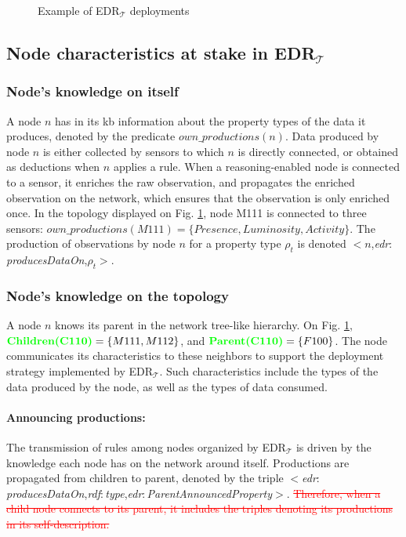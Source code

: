\documentclass{iosart2c}
\newcommand{\edrt}{EDR$_{\mathcal{T}}$\xspace}
\newcommand{\added}[1]{\textcolor{green}{\textbf{#1}}}
\newcommand{\removed}[1]{\textcolor{red}{\sout{#1}}}
\newcommand{\namespace}[1]{\textit{#1$:$}}
\newcommand{\concept}[2]{\namespace{#1}\-\textit{#2}}
\newcommand{\triplet}[3]{$<$#1,\textit{#2},#3$>$}
\begin{document}
\begin{figure}
	\centering
	\caption{Example of \edrt deployments}
	\label{fig:edrpt_deployment}
	\scalebox{0.8}{
		
	}
\end{figure}

\subsection{Node characteristics at stake in \edrt}
\label{subs:edrt_knowledge}

\subsubsection{Node's knowledge on itself}
\label{subsub:self-knowledge}

A node $n$ has in its \gls{kb} information about the property types of the data it produces, denoted by the predicate $own\_productions(n)$.
Data produced by node $n$ is either collected by sensors to which $n$ is directly connected, or obtained as deductions when $n$ applies a rule.
When a reasoning-enabled node is connected to a sensor, it enriches the raw observation, and propagates the enriched observation on the network, which ensures that the observation is only enriched once. 
In the topology displayed on Fig. \ref{fig:edrpt_deployment}, node M111 is connected to three sensors: $own\_productions(M111) = \{Presence, Luminosity, Activity\}$.
The production of observations by node $n$ for a property type $\rho_t$ is denoted \triplet{$n$}{\concept{edr}{produces\-Data\-On}}{$\rho_t$}. 

\subsubsection{Node's knowledge on the topology}
\label{subsub:topology}

A node $n$ knows its parent in the network tree-like hierarchy. 
On Fig. \ref{fig:edrpt_deployment}, $\added{Children(C110)}=\{M111, M112\}$, and $\added{Parent(C110)}=\{F100\}$.
The node communicates its characteristics to these neighbors to support the deployment strategy implemented by \edrt.
Such characteristics include the types of the data produced by the node, as well as the types of data consumed.

\paragraph{Announcing productions:}
The transmission of rules among nodes organized by \edrt is driven by the knowledge each node has on the network around itself.
Productions are propagated from children to parent, denoted by the triple \triplet{\concept{edr}{produces\-Data\-On}}{\concept{rdf}{type}}{\concept{edr}{Parent\-Announced\-Property}}. 
\removed{Therefore, when a child node connects to its parent, it includes the triples denoting its productions in its self-description.}
\end{document}
